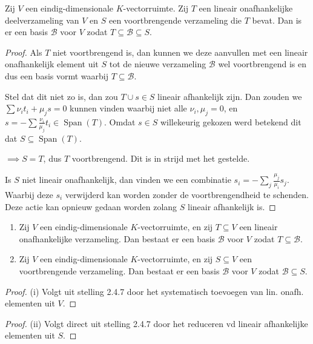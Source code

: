 \begin{stelling}[2.4.7]
    Zij $V$ een eindig-dimensionale $K$-vectorruimte. Zij $T$ een lineair onafhankelijke deelverzameling van $V$ en $S$ een voortbrengende verzameling die $T$ bevat. Dan is er een basis $\mathcal{B}$ voor $V$ zodat $T \subseteq \mathcal{B} \subseteq S$.
\end{stelling}
\begin{proof}
    Als \(T\) niet voortbrengend is, dan kunnen we deze aanvullen met een lineair onafhankelijk element uit \(S\)
    tot de nieuwe verzameling \(\mathcal{B}\) wel voortbrengend is en dus een basis vormt waarbij \(T \subseteq \mathcal{B}\).

    Stel dat dit niet zo is, dan zou \(T \cup s \in S\) lineair afhankelijk zijn.
    Dan zouden we \(\sum \nu_i t_i + \mu_j s = 0\) kunnen vinden waarbij niet alle \(\nu_i, \mu_j = 0\),
    en \(s = -\sum \frac{\nu_i}{\mu_j} t_i \in \operatorname{Span}(T)\).
    Omdat \(s \in S\) willekeurig gekozen werd betekend dit dat \(S \subseteq\operatorname{Span}(T)\).

    \(\implies S = T\), dus \(T\) voortbrengend. Dit is in strijd met het gestelde.

    Is \(S\) niet lineair onafhankelijk,
    dan vinden we een combinatie \(s_i = -\sum_{j} \frac{\mu_j}{\mu_i}s_j\).
    Waarbij deze \(s_i\) verwijderd kan worden zonder de voortbrengendheid te schenden.
    Deze actie kan opnieuw gedaan worden zolang \(S\) lineair afhankelijk is.
\end{proof}

\begin{gevolg}[2.4.8]
    \begin{enumerate}
        \item[(i)] Zij $V$ een eindig-dimensionale $K$-vectorruimte, en zij $T \subseteq V$ een lineair onafhankelijke verzameling. Dan bestaat er een basis $\mathcal{B}$ voor $V$ zodat $T \subseteq \mathcal{B}$.
        \item[(ii)] Zij $V$ een eindig-dimensionale $K$-vectorruimte, en zij $S \subseteq V$ een voortbrengende verzameling. Dan bestaat er een basis $\mathcal{B}$ voor $V$ zodat $\mathcal{B} \subseteq S$.
    \end{enumerate}
\end{gevolg}
\begin{proof}(i)
    Volgt uit stelling 2.4.7 door het systematisch toevoegen van lin. onafh. elementen uit \(V\).
\end{proof}
\begin{proof}(ii)
    Volgt direct uit stelling 2.4.7 door het reduceren vd lineair afhankelijke elementen uit \(S\).
\end{proof}


